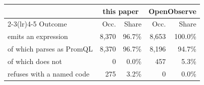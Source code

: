 \begin{tabular}{@{}lrrrr@{}}
\toprule
& \multicolumn{2}{c}{this paper} & \multicolumn{2}{c}{OpenObserve} \\
\cmidrule(lr){2-3}\cmidrule(lr){4-5}
Outcome & Occ. & Share & Occ. & Share \\
\midrule
emits an expression & 8,370 & 96.7\% & 8,653 & 100.0\% \\
\quad of which parses as PromQL & 8,370 & 96.7\% & 8,196 & 94.7\% \\
\quad of which does not & 0 & 0.0\% & 457 & 5.3\% \\
refuses with a named code & 275 & 3.2\% & 0 & 0.0\% \\
\bottomrule
\end{tabular}
